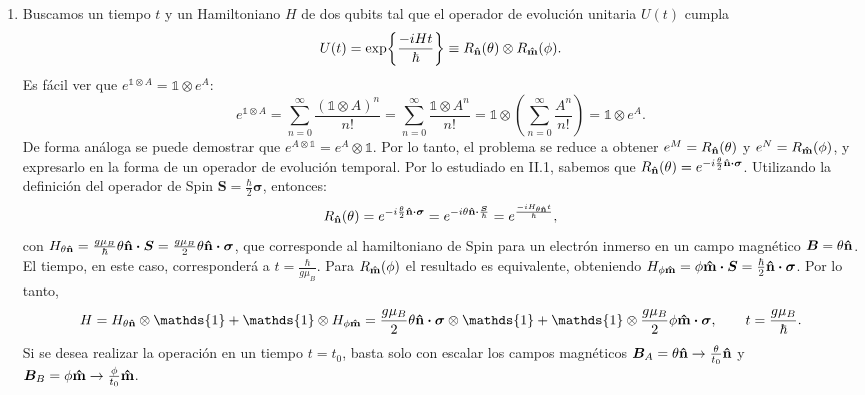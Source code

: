 \documentclass{scrartcl}
\renewcommand{\vb}[1]{\bm{#1}}
\DeclareRobustCommand{\[}{\begin{equation}}
\DeclareRobustCommand{\]}{\end{equation}}
\begin{document}
\begin{enumerate}
    \item Buscamos un tiempo $t$ y un Hamiltoniano $H$ de dos qubits tal que el operador de evolución unitaria $U(t)$ cumpla
    \[ U(t) = \exp{\frac{-iHt}{\hbar}} \equiv R_{\vu{n}}(\theta) \otimes R_{\vu{m}}(\phi). \]
    Es fácil ver que $e^{\mathds{1} \otimes A} = \mathds{1} \otimes e^A$:
    \[ e^{\mathds{1} \otimes A} = \sum_{n = 0}^\infty \frac{(\mathds{1} \otimes A)^n}{n!} = \sum_{n = 0}^\infty \frac{\mathds{1} \otimes A^n}{n!} = \mathds{1} \otimes \left( \sum_{n = 0}^\infty \frac{A^n}{n!} \right) = \mathds{1} \otimes e^A. \]
    De forma análoga se puede demostrar que $e^{A \otimes \mathds{1}} = e^A \otimes \mathds{1}$. Por lo tanto, el problema se reduce a obtener $e^M = R_{\vu{n}}(\theta)$ y $e^N = R_{\vu{m}}(\phi)$, y expresarlo en la forma de un operador de evolución temporal. Por lo estudiado en II.1, sabemos que $R_{\vu{n}}(\theta) = e^{-i \frac{\theta}{2} \vu{n} \vdot \vb{\sigma}}$. Utilizando la definición del operador de Spin $\vb{S} = \frac{\hbar}{2} \vb{\sigma}$, entonces:
    \[ R_{\vu{n}}(\theta) = e^{-i \frac{\theta}{2} \vu{n} \vdot \vb{\sigma}} = e^{-i \theta \vu{n} \vdot \frac{\vb{S}}{\hbar}} = e^{\frac{-i H_{\theta \vu{n}} t}{\hbar}}, \]
    con $H_{\theta \vu{n}} = \frac{g \mu_B}{\hbar} \theta \vu{n} \vdot \vb{S} = \frac{g \mu_B}{2} \theta \vu{n} \vdot \vb{\sigma}$, que corresponde al hamiltoniano de Spin para un electrón inmerso en un campo magnético $\vb{B} = \theta \vu{n}$. El tiempo, en este caso, corresponderá a $t = \frac{\hbar}{g \mu_B}$. Para $R_{\vu{m}}(\phi)$ el resultado es equivalente, obteniendo $H_{\phi \vu{m}} = \phi \vu{m} \vdot \vb{S} = \frac{\hbar}{2} \vu{n} \vdot \vb{\sigma}$. Por lo tanto,
    \[ H = H_{\theta\vu{n}} \otimes \mathds{1} + \mathds{1} \otimes H_{\phi\vu{m}} = \frac{g \mu_B}{2} \theta \vu{n} \vdot \vb{\sigma} \otimes \mathds{1} + \mathds{1} \otimes \frac{g \mu_B}{2} \phi \vu{m} \vdot \vb{\sigma}, \quad \quad t = \frac{g \mu_B}{\hbar}. \]
    Si se desea realizar la operación en un tiempo $t = t_0$, basta solo con escalar los campos magnéticos $\vb{B}_A = \theta \vu{n} \to \frac{\theta}{t_0} \vu{n}$ y $\vb{B}_B = \phi \vu{m} \to \frac{\phi}{t_0} \vu{m}$.
    

\end{enumerate}
\end{document}
